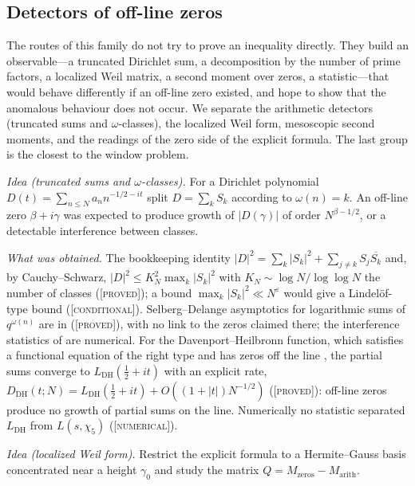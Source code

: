 \documentclass[11pt]{amsart}
\theoremstyle{definition}
\theoremstyle{remark}
\numberwithin{equation}{section}
\newcommand{\stag}[1]{\textsc{[#1]}}
\newcommand{\PROVED}{\stag{proved}}
\newcommand{\COND}{\stag{conditional}}
\newcommand{\NUM}{\stag{numerical}}
\newcommand{\entry}[1]{\par\smallskip\noindent\textit{#1.}\enspace}
\begin{document}
\subsection{Detectors of off-line zeros}\label{w6:fam:R16}

The routes of this family do not try to prove an inequality directly. They build an observable---a
truncated Dirichlet sum, a decomposition by the number of prime factors, a localized Weil matrix, a
second moment over zeros, a statistic---that would behave differently if an off-line zero existed,
and hope to show that the anomalous behaviour does not occur. We separate the arithmetic detectors
(truncated sums and $\omega$-classes), the localized Weil form, mesoscopic second moments, and the
readings of the zero side of the explicit formula. The last group is the closest to the window
problem.

\entry{Idea (truncated sums and $\omega$-classes)} For a Dirichlet polynomial
$D(t)=\sum_{n\le N}a_nn^{-1/2-it}$ split $D=\sum_kS_k$ according to $\omega(n)=k$. An off-line zero
$\beta+i\gamma$ was expected to produce growth of $|D(\gamma)|$ of order $N^{\beta-1/2}$, or a
detectable interference between classes.

\entry{What was obtained} The bookkeeping identity $|D|^2=\sum_k|S_k|^2+\sum_{j\ne k}S_j\overline{S_k}$
and, by Cauchy--Schwarz, $|D|^2\le K_N^2\max_k|S_k|^2$ with $K_N\sim\log N/\log\log N$ the number of
classes \cite[Theorems~3.1, 4.1 and 5.1]{P02} (\PROVED); a bound $\max_k|S_k|^2\ll N^{\varepsilon}$
would give a Lindel\"of-type bound \cite[Corollary~4.2]{P02} (\COND). Selberg--Delange asymptotics
for logarithmic sums of $q^{\omega(n)}$ are in \cite[Proposition~3.1]{P21} (\PROVED), with no link to
the zeros claimed there; the interference statistics of \cite{P03} are numerical. For the
Davenport--Heilbronn function, which satisfies a functional equation of the right type and has
zeros off the line \cite{DavenportHeilbronn1936}, the partial sums converge to
$L_{\mathrm{DH}}(\frac12+it)$ with an explicit rate, $D_{\mathrm{DH}}(t;N)=L_{\mathrm{DH}}(\frac12+it)+O((1+|t|)N^{-1/2})$
\cite[Proposition~2.3]{P04} (\PROVED): off-line zeros produce no growth of partial sums on the line.
Numerically no statistic separated $L_{\mathrm{DH}}$ from $L(s,\chi_5)$ \cite{P04} (\NUM).

\entry{Idea (localized Weil form)} Restrict the explicit formula to a Hermite--Gauss basis
concentrated near a height $\gamma_0$ and study the matrix $Q=M_{\mathrm{zeros}}-M_{\mathrm{arith}}$.
\end{document}
